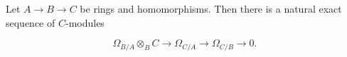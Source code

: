 Let $A \to B \to C$ be rings and homomorphisms. Then there is a natural exact sequence of $C$-modules

$$\Omega_{B/A} \otimes_B C \to \Omega_{C/A} \to \Omega_{C/B} \to 0.$$
